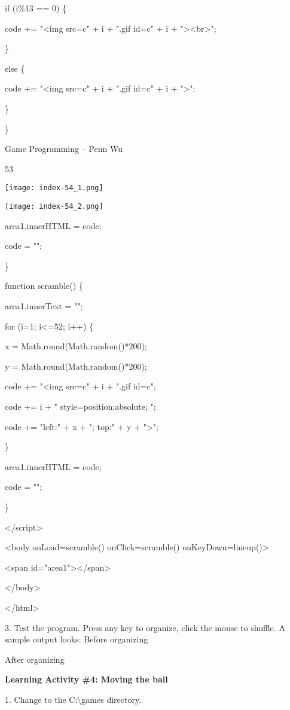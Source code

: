 \documentclass[
]{article}
\begin{document}
if (i\%13 == 0) \{

code += "\textless img src=c" + i + ".gif id=c" + i +
"\textgreater\textless br\textgreater";

\}

else \{

code += "\textless img src=c" + i + ".gif id=c" + i + "\textgreater";

\}

\}

Game Programming -- Penn Wu

53

\protect\hypertarget{index_split_004.htmlux5cux23p54}{}{}\texttt{[image: index-54\_1.png]}

\texttt{[image: index-54\_2.png]}

area1.innerHTML = code;

code = "";

\}

function scramble() \{

area1.innerText = "";

for (i=1; i\textless=52; i++) \{

x = Math.round(Math.random()*200);

y = Math.round(Math.random()*200);

code += "\textless img src=c" + i + ".gif id=c";

code += i + " style=\textquotesingle position:absolute; ";

code += "left:" + x + "; top:" + y + "\textquotesingle\textgreater";

\}

area1.innerHTML = code;

code = "";

\}

\textless/script\textgreater{}

\textless body onLoad=scramble() onClick=scramble()
onKeyDown=lineup()\textgreater{}

\textless span id="area1"\textgreater\textless/span\textgreater{}

\textless/body\textgreater{}

\textless/html\textgreater{}

3. Test the program. Press any key to organize, click the mouse to
shuffle. A sample output looks: Before organizing

After organizing

\textbf{Learning Activity \#4: Moving the ball}

1. Change to the C:\textbackslash games directory.
\end{document}

